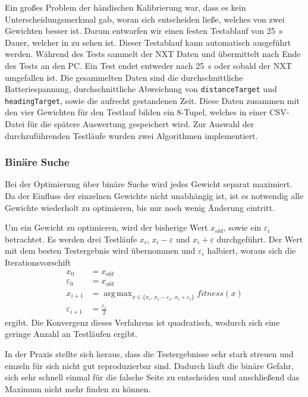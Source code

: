 \documentclass[oneside,abstractoff,a4paper]{scrartcl}
\DeclareMathOperator*{\argmax}{arg\,max}
\begin{document}
Ein großes Problem der händischen Kalibrierung war, dass es kein Unterscheidungsmerkmal gab, woran sich entscheiden ließe, welches von zwei Gewichten besser ist. Darum entwarfen wir einen festen Testablauf von \SI{25}{\second} Dauer, welcher in  zu sehen ist. Dieser Testablauf kann automatisch ausgeführt werden. Während des Tests sammelt der NXT Daten und übermittelt nach Ende des Tests an den PC. Ein Test endet entweder nach \SI{25}{\second} oder sobald der NXT umgefallen ist. Die gesammelten Daten sind die durchschnittliche Batteriespannung, durchschnittliche Abweichung von \texttt{distanceTarget} und \texttt{headingTarget}, sowie die aufrecht gestandenen Zeit. Diese Daten zusammen mit den vier Gewichten für den Testlauf bilden ein 8-Tupel, welches in einer CSV-Datei für die spätere Auswertung gespeichert wird. Zur Auswahl der durchzuführenden Testläufe wurden zwei Algorithmen implementiert.

\subsubsection{Binäre Suche}

Bei der Optimierung über binäre Suche wird jedes Gewicht separat maximiert. Da der Einfluss der einzelnen Gewichte nicht unabhängig ist, ist es notwendig alle Gewichte wiederholt zu optimieren, bis nur noch wenig Änderung eintritt.

Um ein Gewicht zu optimieren, wird der bisherige Wert $x_{old}$, sowie ein $\varepsilon_i$ betrachtet. 
Es werden drei Testläufe $x_i$, $x_i - \varepsilon$ und $x_i + \varepsilon$ durchgeführt. Der Wert mit dem besten Testergebnis wird übernommen und $\varepsilon_i$ halbiert, woraus sich die Iterationsvorschift
\begin{equation*}\begin{split}
x_0 &= x_{old}\\
\varepsilon_0 &= x_{old}\\
x_{i+1} &= \argmax_{x \in \{x_i,\,x_i - \varepsilon_i,\,x_i + \varepsilon_i\}} fitness(x)\\
\varepsilon_{i+1} &=  \frac{\varepsilon_i }{2}
\end{split}\end{equation*}
ergibt. Die Konvergenz dieses Verfahrens ist quadratisch, wodurch sich eine geringe Anzahl an Testläufen ergibt.

In der Praxis stellte sich heraus, dass die Testergebnisse sehr stark streuen und einzeln für sich nicht gut reproduzierbar sind. Dadurch läuft die binäre Gefahr, sich sehr schnell einmal für die falsche Seite zu entscheiden und anschließend das Maximum nicht mehr finden zu können.
\end{document}
